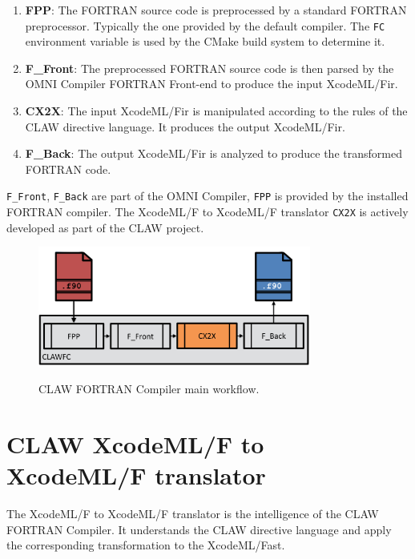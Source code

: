 \documentclass[a4paper, 11pt]{report}
\def\clawfcomp{CLAW FORTRAN Compiler\xspace}
\def\omni{OMNI Compiler\xspace}
\def\xcodeml{XcodeML/F\xspace}
\def\ffront{\lstinline!F_Front!\xspace}
\def\fback{\lstinline!F_Back!\xspace}
\def\fpp{\lstinline!FPP!\xspace}
\def\cx2x{\lstinline!CX2X!\xspace}
\begin{document}
\begin{enumerate}
\item \textbf{FPP}: The FORTRAN source code is preprocessed by a standard FORTRAN preprocessor. Typically the one provided by the default compiler. 
The \lstinline|FC| environment variable is used by the CMake build system to determine it.
\item \textbf{F\_Front}: The preprocessed FORTRAN source code is then parsed by the OMNI Compiler FORTRAN Front-end to produce the input \xcodeml \gls{ir}.
\item \textbf{CX2X}: The input \xcodeml \gls{ir} is manipulated according to the rules of the CLAW directive language. It produces the output \xcodeml \gls{ir}.
\item \textbf{F\_Back}: The output \xcodeml \gls{ir} is analyzed to produce the transformed FORTRAN code. 
\end{enumerate}

\ffront{}, \fback{} are part of the \omni{}, \fpp{} is provided by the installed FORTRAN compiler. The \xcodeml to \xcodeml translator \cx2x{} is actively developed as part of the CLAW project.  

\begin{figure}[!ht]
  \centering
  \includegraphics[width=0.8\textwidth]{resources/clawfc_global_workflow.png} \\
  \caption{CLAW FORTRAN Compiler main workflow.}
  \label{fig:clawfc_main_workflow}
\end{figure}

\section{CLAW \xcodeml to \xcodeml translator}
The \xcodeml to \xcodeml translator is the intelligence of the \clawfcomp. It understands the CLAW directive language and apply the corresponding transformation to the \xcodeml \gls{ast}.
\end{document}
